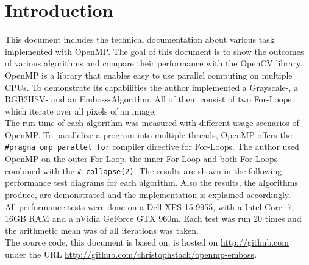 \chapter{Introduction}

This document includes the technical documentation about various task implemented with OpenMP. The goal of this document is to show the outcomes of various algorithms and compare their performance with the OpenCV library. OpenMP is a library that enables easy to use parallel computing on multiple CPUs. To demonstrate its capabilities the author implemented a Grayscale-, a RGB2HSV- and an Emboss-Algorithm. All of them consist of two For-Loops, which iterate over all pixels of an image.\\

The run time of each algorithm was measured with different usage scenarios of OpenMP. To parallelize a program into multiple threads, OpenMP offers the \texttt{#pragma omp parallel for} compiler directive for For-Loops.  The author used OpenMP on the outer For-Loop, the inner For-Loop and both For-Loops combined with the \texttt{# collapse(2)}. The results are shown in the following performance test diagrams for each algorithm. Also the results, the algorithms produce, are demonstrated and the implementation is explained accordingly.\\

All performance tests were done on a Dell XPS 15 9955, with a Intel Core i7, 16GB RAM and a nVidia GeForce GTX 960m. Each test was run 20 times and the arithmetic mean was of all iterations was taken. \\

The source code, this document is based on, is hosted on \url{http://github.com} under the URL \url{http://github.com/christophstach/openmp-emboss}.

